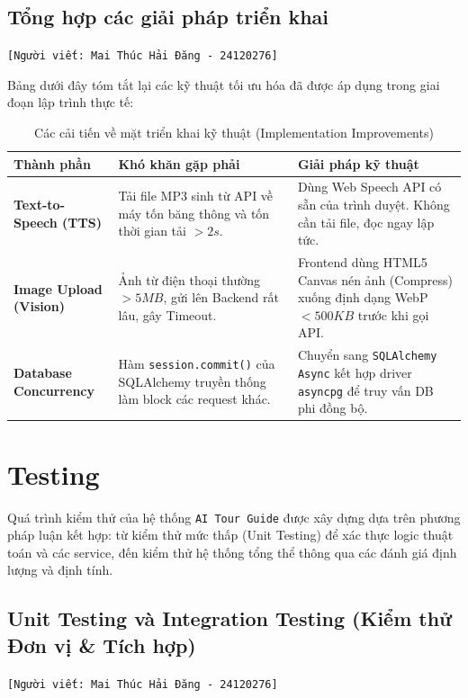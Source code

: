 \subsection{Tổng hợp các giải pháp triển khai}
\texttt{[Người viết: Mai Thúc Hải Đăng - 24120276]}

Bảng dưới đây tóm tắt lại các kỹ thuật tối ưu hóa đã được áp dụng trong giai đoạn lập trình thực tế:

\begin{table}[H]
    \centering
    \renewcommand{\arraystretch}{1.4}
    \begin{tabular}{|p{4.5cm}|p{5cm}|p{5cm}|}
        \hline
        \textbf{Thành phần} & \textbf{Khó khăn gặp phải} & \textbf{Giải pháp kỹ thuật} \\ \hline
        \textbf{Text-to-Speech (TTS)} & Tải file MP3 sinh từ API về máy tốn băng thông và tốn thời gian tải $> 2s$. & Dùng Web Speech API có sẵn của trình duyệt. Không cần tải file, đọc ngay lập tức. \\ \hline
        \textbf{Image Upload (Vision)} & Ảnh từ điện thoại thường $> 5MB$, gửi lên Backend rất lâu, gây Timeout. & Frontend dùng HTML5 Canvas nén ảnh (Compress) xuống định dạng WebP $< 500KB$ trước khi gọi API. \\ \hline
        \textbf{Database Concurrency} & Hàm \texttt{session.commit()} của SQLAlchemy truyền thống làm block các request khác. & Chuyển sang \texttt{SQLAlchemy Async} kết hợp driver \texttt{asyncpg} để truy vấn DB phi đồng bộ. \\ \hline
    \end{tabular}
    \caption{Các cải tiến về mặt triển khai kỹ thuật (Implementation Improvements)}
\end{table}

\section{Testing}

Quá trình kiểm thử của hệ thống \texttt{AI Tour Guide} được xây dựng dựa trên phương pháp luận kết hợp: từ kiểm thử mức thấp (Unit Testing) để xác thực logic thuật toán và các service, đến kiểm thử hệ thống tổng thể thông qua các đánh giá định lượng và định tính.

\subsection{Unit Testing và Integration Testing (Kiểm thử Đơn vị \& Tích hợp)}
\texttt{[Người viết: Mai Thúc Hải Đăng - 24120276]}


